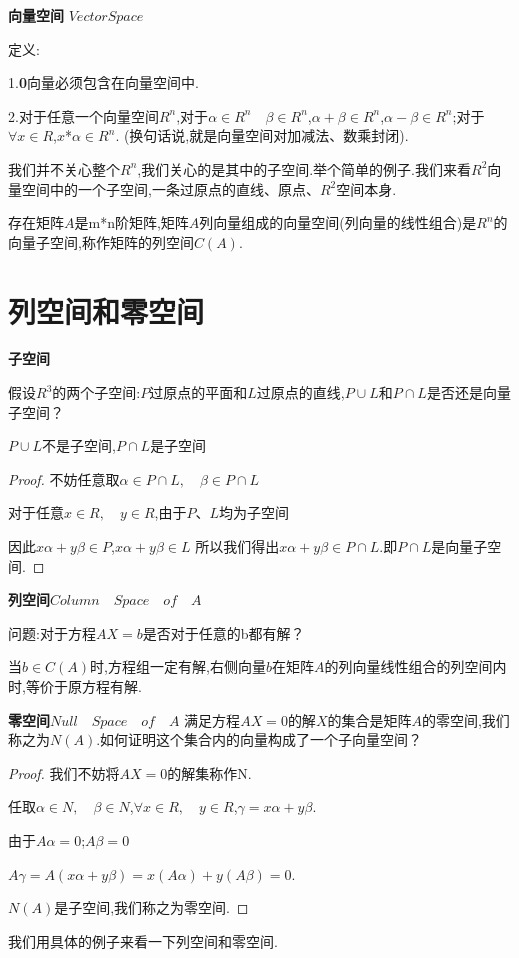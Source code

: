 \documentclass[oneside]{book}
\begin{document}
	\textbf{向量空间}  $Vector Space $
	
	定义:
	
	1.\textbf{0}向量必须包含在向量空间中.
	
	2.对于任意一个向量空间$R^{n}$,对于$\alpha \in R^{n} \quad \beta \in R^{n}$,$\alpha+\beta \in R^{n}$,$\alpha-\beta \in R^{n}$;对于$ \forall x \in R $,$x$*$\alpha \in R^{n}$.
	(换句话说,就是向量空间对加减法、数乘封闭).
	
	我们并不关心整个$ R^{n}$,我们关心的是其中的子空间.举个简单的例子.我们来看$ R^{2} $向量空间中的一个子空间,一条过原点的直线、原点、$R^{2}$空间本身.
	
	存在矩阵$A$是m*n阶矩阵,矩阵$A$列向量组成的向量空间(列向量的线性组合)是$R^{n}$的向量子空间,称作矩阵的列空间$C(A)$.
	
	\chapter{列空间和零空间}
	\textbf{子空间}
	
	假设$R^{3}$的两个子空间:$P$过原点的平面和$L$过原点的直线,\quad$P\cup L$和$P\cap L$是否还是向量子空间？
	
	$P\cup L$不是子空间,$P\cap L$是子空间
	\begin{proof}
		不妨任意取$ \alpha \in P\cap L, \quad \beta \in P\cap L $
		
		对于任意$x\in R, \quad y \in R$,由于$P$、$L$均为子空间
		
		因此$x\alpha+y\beta \in P$,\quad $x\alpha+y\beta \in L$
		所以我们得出$x\alpha+y\beta \in P\cap L$.即$P\cap L$是向量子空间.
	\end{proof}
	\textbf{列空间}\qquad $Column \quad Space\quad of\quad A$
	
	问题:对于方程$AX=b$是否对于任意的b都有解？
	 
	 当$b \in C(A)$时,方程组一定有解,右侧向量$b$在矩阵$A$的列向量线性组合的列空间内时,等价于原方程有解.
	 
	 \textbf{零空间}\qquad  $Null\quad Space\quad of \quad A$
	 满足方程$AX=0$的解$X$的集合是矩阵$A$的零空间,我们称之为$N(A)$.如何证明这个集合内的向量构成了一个子向量空间？
	 \begin{proof}
	 	我们不妨将$AX=0$的解集称作N.
	 	
	 	任取$\alpha \in N ,\quad \beta\in N$,\quad$\forall x \in R ,\quad y\in R $,\quad $\gamma=x\alpha+y\beta$.
	 	
	 	由于$A\alpha=0$;\quad $A\beta=0$
	 	
	 	$A\gamma=A(x \alpha+y\beta)=x(A\alpha)+y(A\beta)=0$.
	 	
	 	$N(A)$是子空间,我们称之为零空间.
	 \end{proof}
	 我们用具体的例子来看一下列空间和零空间.
	 
\end{document}
